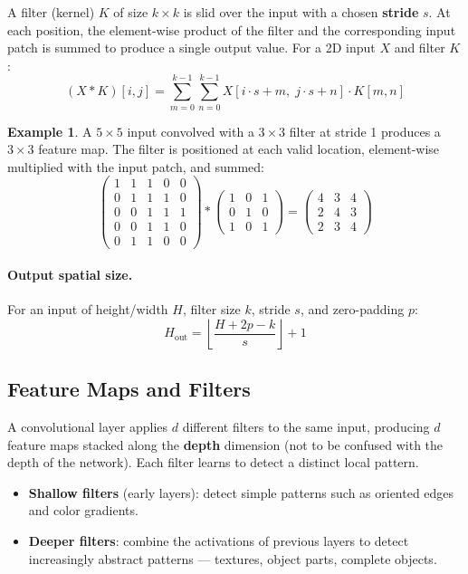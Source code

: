 \documentclass[11pt,a4paper]{article}
\theoremstyle{definition}
\newtheorem{example}{Example}[section]
\theoremstyle{plain}
\theoremstyle{remark}
\begin{document}
A filter (kernel) $K$ of size $k \times k$ is slid over the input with a chosen \textbf{stride} $s$. At each position, the element-wise product of the filter and the corresponding input patch is summed to produce a single output value. For a 2D input $X$ and filter $K$:
\[
    (X * K)[i,j] = \sum_{m=0}^{k-1}\sum_{n=0}^{k-1} X[i \cdot s + m,\; j \cdot s + n] \cdot K[m,n]
\]

\begin{example}
A $5 \times 5$ input convolved with a $3 \times 3$ filter at stride 1 produces a $3 \times 3$ feature map. The filter is positioned at each valid location, element-wise multiplied with the input patch, and summed:
\[
\begin{pmatrix}1&1&1&0&0\\0&1&1&1&0\\0&0&1&1&1\\0&0&1&1&0\\0&1&1&0&0\end{pmatrix}
*
\begin{pmatrix}1&0&1\\0&1&0\\1&0&1\end{pmatrix}
=
\begin{pmatrix}4&3&4\\2&4&3\\2&3&4\end{pmatrix}
\]
\end{example}

\paragraph{Output spatial size.} For an input of height/width $H$, filter size $k$, stride $s$, and zero-padding $p$:
\[
    H_{\text{out}} = \left\lfloor \frac{H + 2p - k}{s} \right\rfloor + 1
\]

\subsection{Feature Maps and Filters}

A convolutional layer applies $d$ different filters to the same input, producing $d$ feature maps stacked along the \textbf{depth} dimension (not to be confused with the depth of the network). Each filter learns to detect a distinct local pattern.

\begin{itemize}
    \item \textbf{Shallow filters} (early layers): detect simple patterns such as oriented edges and color gradients.
    \item \textbf{Deeper filters}: combine the activations of previous layers to detect increasingly abstract patterns --- textures, object parts, complete objects.
\end{itemize}
\end{document}
